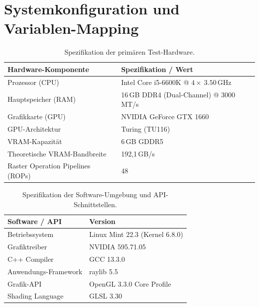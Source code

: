 \chapter{Systemkonfiguration und Variablen-Mapping}
\label{ch:AA_configuration_and_variable_mapping}

\begin{table}[htbp]
    \centering
    \caption{Spezifikation der primären Test-Hardware.}
    \label{tab:hardware_specs}
    \renewcommand{\arraystretch}{1.2}
    \begin{tabularx}{\textwidth}{@{} l X @{}}
        \toprule
        \textbf{Hardware-Komponente}      & \textbf{Spezifikation / Wert}                      \\
        \midrule
        Prozessor (\ac{CPU})                   & Intel Core i5-6600K @ $4\times~3.50$\,GHz          \\
        Hauptspeicher (RAM)               & 16\,GB DDR4 (Dual-Channel) @ 3000\,MT/s            \\
        Grafikkarte (\ac{GPU})                 & NVIDIA GeForce GTX 1660                            \\
        \ac{GPU}-Architektur                   & Turing (TU116)                                     \\
        \ac{VRAM}-Kapazität                    & 6\,GB GDDR5                                        \\
        Theoretische \ac{VRAM}-Bandbreite      & 192,1\,GB/s                                        \\
        Raster Operation Pipelines (ROPs)             & 48                                                 \\
        \bottomrule
    \end{tabularx}
\end{table}

\begin{table}[htbp]
    \centering
    \caption{Spezifikation der Software-Umgebung und API-Schnittstellen.}
    \label{tab:software_specs}
    \renewcommand{\arraystretch}{1.2}
    \begin{tabularx}{\textwidth}{@{} l X @{}}
        \toprule
        \textbf{Software / \ac{API}} & \textbf{Version}               \\
        \midrule
        Betriebssystem          & Linux Mint 22.3 (Kernel 6.8.0) \\
        Grafiktreiber           & NVIDIA 595.71.05               \\
        C++ Compiler            & GCC 13.3.0                     \\
        Anwendungs-Framework    & raylib 5.5                     \\
        Grafik-\ac{API}             & OpenGL 3.3.0 Core Profile      \\
        Shading Language        & GLSL 3.30                      \\
        \bottomrule
    \end{tabularx}
\end{table}

